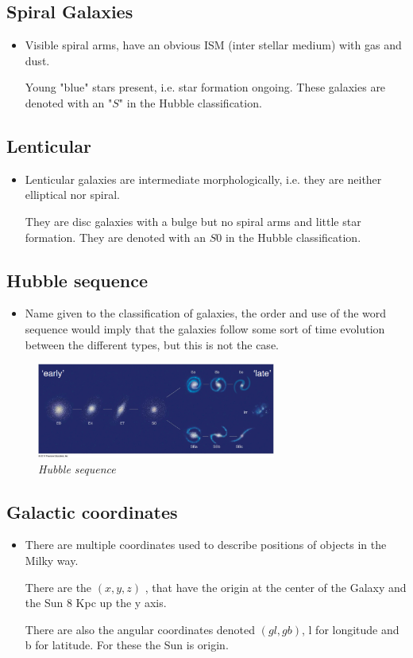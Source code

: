 \documentclass[11pt]{article}
\numberwithin{equation}{section}
\begin{document}
\subsection{Spiral Galaxies}
\begin{itemize}
\item Visible spiral arms, have an obvious ISM (inter stellar medium) with gas and dust. 

Young "blue" stars present, i.e. star formation ongoing. 
These galaxies are denoted with an "$S$" in the Hubble classification. 
\end{itemize}

\subsection{Lenticular}
\begin{itemize}
    \item Lenticular galaxies are intermediate morphologically, i.e. they are neither elliptical nor spiral.

They are disc galaxies with a bulge but no spiral arms and little star formation. 
They are denoted with an $S0$ in the Hubble classification. 
\end{itemize}

\subsection{Hubble sequence}
\begin{itemize}
    \item Name given to the classification of galaxies, the order and use of the word sequence would imply that the galaxies follow some sort of time evolution between the different types, but this is not the case. 
\end{itemize}


\begin{figure}[H]
\centering
\includegraphics[width=0.7\textwidth]{Hubble sequence.png}
\caption{\label{fig:2}\emph{Hubble sequence}}
\end{figure}

\subsection{Galactic coordinates} 
\begin{itemize}
\item There are multiple coordinates used to describe positions of objects in the Milky way. 

There are the $(x,y,z)$ , that have the origin at the center of the Galaxy and the Sun $8$ Kpc up the y axis.

There are also the angular coordinates denoted $(gl,gb)$, l for longitude and b for latitude. For these the Sun is origin. 
\end{itemize}
\end{document}
